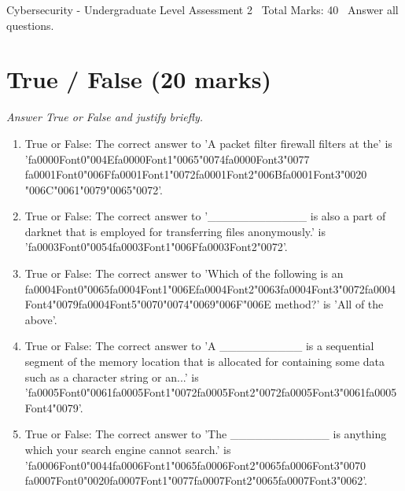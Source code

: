 \documentclass[12pt]{article}
\begin{document}
\begin{center}
Cybersecurity - Undergraduate Level Assessment 2 \
Total Marks: 40 \
Answer all questions.
\end{center}

\section*{True / False (20 marks)}
\textit{Answer True or False and justify briefly.}
\begin{enumerate}[label=\arabic*.]
\item True or False: The correct answer to 'A packet filter firewall filters at the' is '{\csname fa0000Font0\endcsname\char"004E}{\csname fa0000Font1\endcsname\char"0065}{\char"0074}{\csname fa0000Font3\endcsname\char"0077} {\csname fa0001Font0\endcsname\char"006F}{\csname fa0001Font1\endcsname\char"0072}{\csname fa0001Font2\endcsname\char"006B}{\csname fa0001Font3\endcsname\char"0020} {\char"006C}{\char"0061}{\char"0079}{\char"0065}{\char"0072}'.
\item True or False: The correct answer to '\_\_\_\_\_\_\_\_\_\_\_\_ is also a part of darknet that is employed for transferring files anonymously.' is '{\csname fa0003Font0\endcsname\char"0054}{\csname fa0003Font1\endcsname\char"006F}{\csname fa0003Font2\endcsname\char"0072}'.
\item True or False: The correct answer to 'Which of the following is an {\csname fa0004Font0\endcsname\char"0065}{\csname fa0004Font1\endcsname\char"006E}{\csname fa0004Font2\endcsname\char"0063}{\csname fa0004Font3\endcsname\char"0072}{\csname fa0004Font4\endcsname\char"0079}{\csname fa0004Font5\endcsname\char"0070}{\char"0074}{\char"0069}{\char"006F}{\char"006E} method?' is 'All of the above'.
\item True or False: The correct answer to 'A \_\_\_\_\_\_\_\_\_\_ is a sequential segment of the memory location that is allocated for containing some data such as a character string or an...' is '{\csname fa0005Font0\endcsname\char"0061}{\csname fa0005Font1\endcsname\char"0072}{\csname fa0005Font2\endcsname\char"0072}{\csname fa0005Font3\endcsname\char"0061}{\csname fa0005Font4\endcsname\char"0079}'.
\item True or False: The correct answer to 'The \_\_\_\_\_\_\_\_\_\_\_\_ is anything which your search engine cannot search.' is '{\csname fa0006Font0\endcsname\char"0044}{\csname fa0006Font1\endcsname\char"0065}{\csname fa0006Font2\endcsname\char"0065}{\csname fa0006Font3\endcsname\char"0070} {\csname fa0007Font0\endcsname\char"0020}{\csname fa0007Font1\endcsname\char"0077}{\csname fa0007Font2\endcsname\char"0065}{\csname fa0007Font3\endcsname\char"0062}'.

\end{enumerate}
\end{document}

